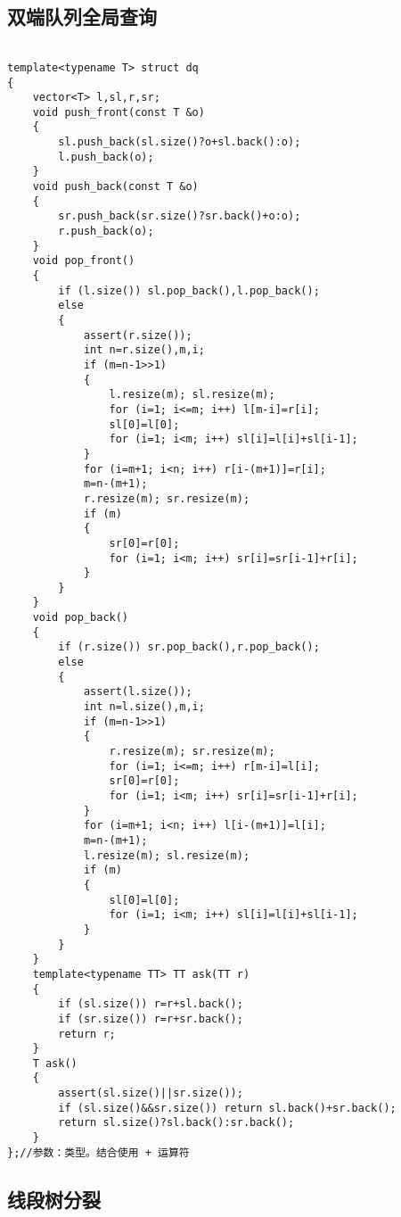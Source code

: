 \documentclass[12pt]{ctexart}
\begin{document}
\subsection{双端队列全局查询}

\begin{lstlisting}

template<typename T> struct dq
{
	vector<T> l,sl,r,sr;
	void push_front(const T &o)
	{
		sl.push_back(sl.size()?o+sl.back():o);
		l.push_back(o);
	}
	void push_back(const T &o)
	{
		sr.push_back(sr.size()?sr.back()+o:o);
		r.push_back(o);
	}
	void pop_front()
	{
		if (l.size()) sl.pop_back(),l.pop_back();
		else
		{
			assert(r.size());
			int n=r.size(),m,i;
			if (m=n-1>>1)
			{
				l.resize(m); sl.resize(m);
				for (i=1; i<=m; i++) l[m-i]=r[i];
				sl[0]=l[0];
				for (i=1; i<m; i++) sl[i]=l[i]+sl[i-1];
			}
			for (i=m+1; i<n; i++) r[i-(m+1)]=r[i];
			m=n-(m+1);
			r.resize(m); sr.resize(m);
			if (m)
			{
				sr[0]=r[0];
				for (i=1; i<m; i++) sr[i]=sr[i-1]+r[i];
			}
		}
	}
	void pop_back()
	{
		if (r.size()) sr.pop_back(),r.pop_back();
		else
		{
			assert(l.size());
			int n=l.size(),m,i;
			if (m=n-1>>1)
			{
				r.resize(m); sr.resize(m);
				for (i=1; i<=m; i++) r[m-i]=l[i];
				sr[0]=r[0];
				for (i=1; i<m; i++) sr[i]=sr[i-1]+r[i];
			}
			for (i=m+1; i<n; i++) l[i-(m+1)]=l[i];
			m=n-(m+1);
			l.resize(m); sl.resize(m);
			if (m)
			{
				sl[0]=l[0];
				for (i=1; i<m; i++) sl[i]=l[i]+sl[i-1];
			}
		}
	}
	template<typename TT> TT ask(TT r)
	{
		if (sl.size()) r=r+sl.back();
		if (sr.size()) r=r+sr.back();
		return r;
	}
	T ask()
	{
		assert(sl.size()||sr.size());
		if (sl.size()&&sr.size()) return sl.back()+sr.back();
		return sl.size()?sl.back():sr.back();
	}
};//参数：类型。结合使用 + 运算符

\end{lstlisting}

\subsection{线段树分裂}
\end{document}
